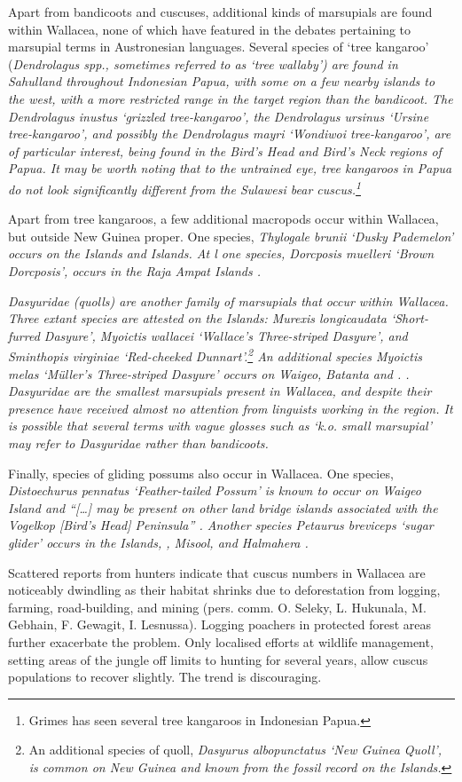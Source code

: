 Apart from bandicoots and cuscuses, additional kinds of marsupials
are found within Wallacea,
none of which have featured in the debates pertaining to marsupial
terms in Austronesian languages.
Several species of ‘tree kangaroo’ (\it{Dendrolagus spp}.,
sometimes referred to as ‘tree wallaby’) are found in Sahulland
throughout Indonesian Papua, with some on a few nearby islands to the west,
with a more restricted range in the target region than the bandicoot.
The \it{Dendrolagus inustus} ‘grizzled tree-kangaroo’,
the \it{Dendrolagus ursinus} ‘Ursine tree-kangaroo’,
and possibly the \it{Dendrolagus mayri} ‘Wondiwoi tree-kangaroo’,
are of particular interest,
being found in the Bird’s Head
and Bird’s Neck regions of Papua.
It may be worth noting that to the untrained eye,
tree kangaroos in Papua do not look significantly different from
the Sulawesi bear cuscus.\footnote{
		Grimes has seen several tree
		kangaroos in Indonesian Papua.}

Apart from tree kangaroos,
a few additional macropods occur within Wallacea, but outside New Guinea proper.
One species, \it{Thylogale brunii} ‘Dusky Pademelon’ occurs on
the  Islands and  Islands.
At l one species,
\it{Dorcposis muelleri} ‘Brown Dorcposis’,
occurs in the Raja Ampat Islands
\citep[60f, 64f]{LaveryFlannery2023}.

\it{Dasyuridae} (quolls) are another family of marsupials that occur within Wallacea.
Three extant species are attested on the  Islands: \it{Murexis
longicaudata} ‘Short-furred Dasyure’, \it{Myoictis wallacei} ‘Wallace’s Three-striped Dasyure’,
and \it{Sminthopis virginiae} ‘Red-cheeked Dunnart’.\footnote{
		An
		additional species of quoll,
		\it{Dasyurus albopunctatus} ‘New Guinea Quoll’,
		is common on New Guinea
		and known from the fossil record on the  Islands.}
An additional
species \it{Myoictis melas} ‘Müller’s Three-striped Dasyure’
occurs on Waigeo, Batanta and . \citep[42--48]{LaveryFlannery2023}.
\it{Dasyuridae} are the smallest marsupials present in Wallacea,
and despite their presence have received almost no attention
from linguists working in the region.
It is possible that several terms with vague glosses such as ‘k.o.
small marsupial’ may refer to \it{Dasyuridae} rather than bandicoots.

Finally, species of gliding possums also occur in Wallacea.
One species, \it{Distoechurus pennatus} ‘Feather-tailed Possum’
is known to occur on Waigeo Island
and “[{\ldots}] may be present on other land bridge islands associated
with the Vogelkop [Bird’s Head] Peninsula” \citep[56]{LaveryFlannery2023}.
Another species \it{Petaurus breviceps} ‘sugar glider’ occurs
in the  Islands,
, Misool, and Halmahera \citep{Salas2016}.

Scattered reports from hunters indicate that cuscus numbers in
Wallacea are noticeably dwindling as their habitat shrinks due
to deforestation from logging,
farming, road-building, and mining (pers. comm. O. Seleky, L.
Hukunala, M. Gebhain, F. Gewagit, I. Lesnussa).
Logging poachers in protected forest areas further exacerbate the problem.
Only localised efforts at wildlife management,
setting areas of the jungle off limits to hunting for several
years, allow cuscus populations to recover slightly.
The trend is discouraging.